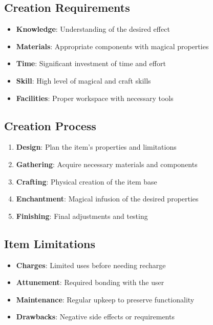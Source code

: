 \subsection*{Creation Requirements}
\begin{itemize}
\item \textbf{Knowledge}: Understanding of the desired effect
\item \textbf{Materials}: Appropriate components with magical properties
\item \textbf{Time}: Significant investment of time and effort
\item \textbf{Skill}: High level of magical and craft skills
\item \textbf{Facilities}: Proper workspace with necessary tools
\end{itemize}

\subsection*{Creation Process}
\begin{enumerate}
\item \textbf{Design}: Plan the item's properties and limitations
\item \textbf{Gathering}: Acquire necessary materials and components
\item \textbf{Crafting}: Physical creation of the item base
\item \textbf{Enchantment}: Magical infusion of the desired properties
\item \textbf{Finishing}: Final adjustments and testing
\end{enumerate}

\subsection*{Item Limitations}
\begin{itemize}
\item \textbf{Charges}: Limited uses before needing recharge
\item \textbf{Attunement}: Required bonding with the user
\item \textbf{Maintenance}: Regular upkeep to preserve functionality
\item \textbf{Drawbacks}: Negative side effects or requirements
\end{itemize}


